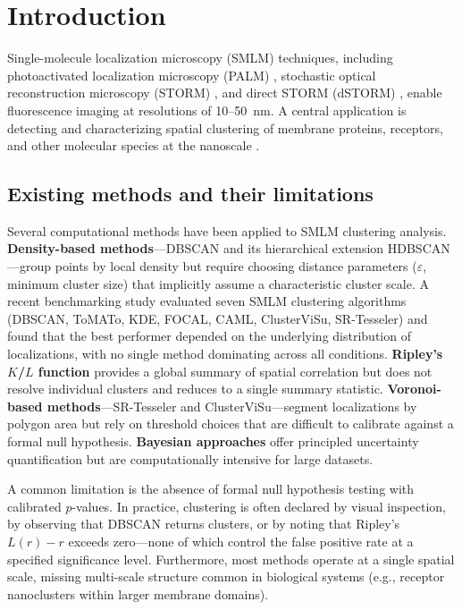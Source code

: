 \documentclass[11pt]{article}
\begin{document}
\section{Introduction}

Single-molecule localization microscopy (SMLM) techniques, including
photoactivated localization microscopy (PALM)
\citep{betzig2006,hess2006}, stochastic optical reconstruction microscopy
(STORM) \citep{rust2006}, and direct STORM (dSTORM) \citep{heilemann2008},
enable fluorescence imaging at resolutions of 10--50~nm. A central
application is detecting and characterizing spatial clustering of membrane
proteins, receptors, and other molecular species at the nanoscale
\citep{khater2020}.

\subsection{Existing methods and their limitations}

Several computational methods have been applied to SMLM clustering
analysis. \textbf{Density-based methods}---DBSCAN \citep{ester1996} and
its hierarchical extension HDBSCAN---group points by local density but
require choosing distance parameters ($\varepsilon$, minimum cluster size)
that implicitly assume a characteristic cluster scale. A recent
benchmarking study \citep{nieves2023} evaluated seven SMLM clustering
algorithms (DBSCAN, ToMATo, KDE, FOCAL, CAML, ClusterViSu, SR-Tesseler)
and found that the best performer depended on the underlying distribution
of localizations, with no single method dominating across all conditions.
\textbf{Ripley's $K$/$L$ function} \citep{ripley1977,ripley1976} provides
a global summary of spatial correlation but does not resolve individual
clusters and reduces to a single summary statistic.
\textbf{Voronoi-based methods}---SR-Tesseler \citep{levet2015} and
ClusterViSu---segment localizations by polygon area but rely on threshold
choices that are difficult to calibrate against a formal null hypothesis.
\textbf{Bayesian approaches} \citep{rubin-delanchy2015} offer principled
uncertainty quantification but are computationally intensive for large
datasets.

A common limitation is the absence of formal null hypothesis testing with
calibrated $p$-values. In practice, clustering is often declared by visual
inspection, by observing that DBSCAN returns clusters, or by noting that
Ripley's $L(r) - r$ exceeds zero---none of which control the false
positive rate at a specified significance level. Furthermore, most methods
operate at a single spatial scale, missing multi-scale structure common in
biological systems (e.g., receptor nanoclusters within larger membrane
domains).
\end{document}
